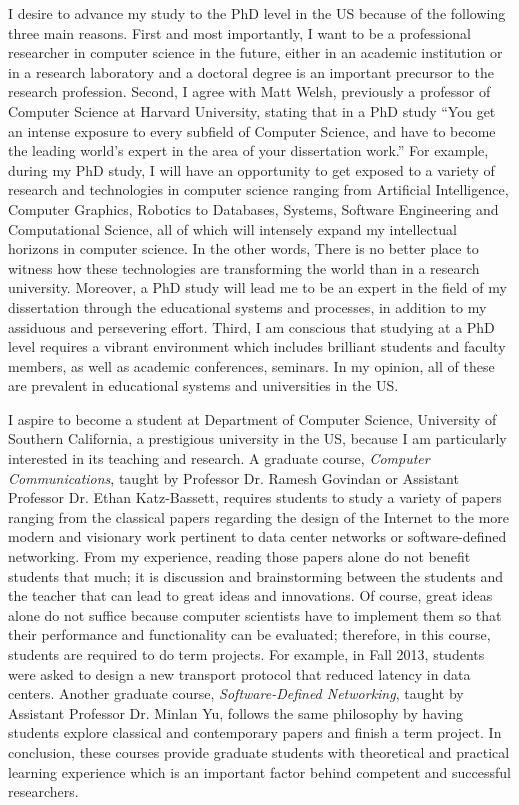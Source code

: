 \documentclass[a4paper]{report}
\newcommand{\university}{University of Southern California}
\newcommand{\department}{Department of Computer Science}
\begin{document}
\vspace{0.2cm}
I desire to advance my study to the PhD level in the US because of the following three main reasons. First and most importantly, I want to be a professional researcher in computer science in the future, either in an academic institution or in a research laboratory and a doctoral degree is an important precursor to the research profession. Second, I agree with Matt Welsh, previously a professor of Computer Science at Harvard University, stating that in a PhD study ``You get an intense exposure to every subfield of Computer Science, and have to become the leading world's expert in the area of your dissertation work.'' For example, during my PhD study, I will have an opportunity to get exposed to a variety of research and technologies in computer science ranging from Artificial Intelligence, Computer Graphics, Robotics to Databases, Systems, Software Engineering and Computational Science, all of which will intensely expand my intellectual horizons in computer science. In the other words, There is no better place to witness how these technologies are transforming the world than in a research university. Moreover, a PhD study will lead me to be an expert in the field of my dissertation through the educational systems and processes, in addition to my assiduous and persevering effort. Third, I am conscious that studying at a PhD level requires a vibrant environment which includes brilliant students and faculty members, as well as academic conferences, seminars. In my opinion, all of these are prevalent in educational systems and universities in the US.

\vspace{0.2cm}
I aspire to become a student at \department, \university, a prestigious university in the US, because I am particularly interested in its teaching and research. A graduate course, \textit{Computer Communications}, taught by Professor Dr. Ramesh Govindan or Assistant Professor Dr. Ethan Katz-Bassett, requires students to study a variety of papers ranging from the classical papers regarding the design of the Internet to the more modern and visionary work pertinent to data center networks or software-defined networking. From my experience, reading those papers alone do not benefit students that much; it is discussion and brainstorming between the students and the teacher that can lead to great ideas and innovations. Of course, great ideas alone do not suffice because computer scientists have to implement them so that their performance and functionality can be evaluated; therefore, in this course, students are required to do term projects. For example, in Fall 2013, students were asked to design a new transport protocol that reduced latency in data centers. Another graduate course, \textit{Software-Defined Networking}, taught by Assistant Professor Dr. Minlan Yu, follows the same philosophy by having students explore classical and contemporary papers and finish a term project. In conclusion, these courses provide graduate students with theoretical and practical learning experience which is an important factor behind competent and successful researchers.
\end{document}
